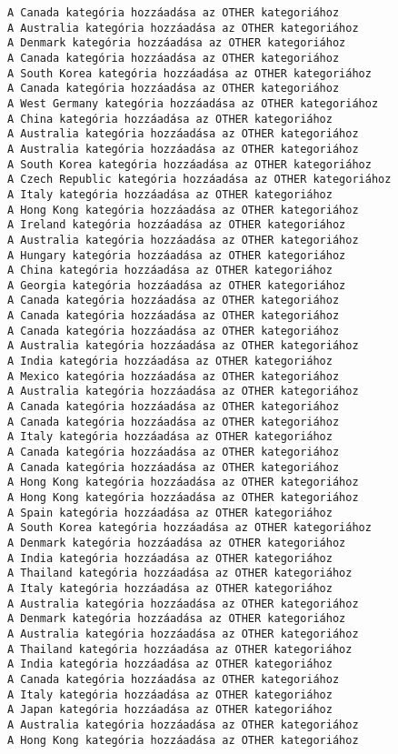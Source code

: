 \documentclass[11pt]{article}
\begin{document}
\begin{Verbatim}[commandchars=\\\{\}]
A Canada kategória hozzáadása az OTHER kategoriához
A Australia kategória hozzáadása az OTHER kategoriához
A Denmark kategória hozzáadása az OTHER kategoriához
A Canada kategória hozzáadása az OTHER kategoriához
A South Korea kategória hozzáadása az OTHER kategoriához
A Canada kategória hozzáadása az OTHER kategoriához
A West Germany kategória hozzáadása az OTHER kategoriához
A China kategória hozzáadása az OTHER kategoriához
A Australia kategória hozzáadása az OTHER kategoriához
A Australia kategória hozzáadása az OTHER kategoriához
A South Korea kategória hozzáadása az OTHER kategoriához
A Czech Republic kategória hozzáadása az OTHER kategoriához
A Italy kategória hozzáadása az OTHER kategoriához
A Hong Kong kategória hozzáadása az OTHER kategoriához
A Ireland kategória hozzáadása az OTHER kategoriához
A Australia kategória hozzáadása az OTHER kategoriához
A Hungary kategória hozzáadása az OTHER kategoriához
A China kategória hozzáadása az OTHER kategoriához
A Georgia kategória hozzáadása az OTHER kategoriához
A Canada kategória hozzáadása az OTHER kategoriához
A Canada kategória hozzáadása az OTHER kategoriához
A Canada kategória hozzáadása az OTHER kategoriához
A Australia kategória hozzáadása az OTHER kategoriához
A India kategória hozzáadása az OTHER kategoriához
A Mexico kategória hozzáadása az OTHER kategoriához
A Australia kategória hozzáadása az OTHER kategoriához
A Canada kategória hozzáadása az OTHER kategoriához
A Canada kategória hozzáadása az OTHER kategoriához
A Italy kategória hozzáadása az OTHER kategoriához
A Canada kategória hozzáadása az OTHER kategoriához
A Canada kategória hozzáadása az OTHER kategoriához
A Hong Kong kategória hozzáadása az OTHER kategoriához
A Hong Kong kategória hozzáadása az OTHER kategoriához
A Spain kategória hozzáadása az OTHER kategoriához
A South Korea kategória hozzáadása az OTHER kategoriához
A Denmark kategória hozzáadása az OTHER kategoriához
A India kategória hozzáadása az OTHER kategoriához
A Thailand kategória hozzáadása az OTHER kategoriához
A Italy kategória hozzáadása az OTHER kategoriához
A Australia kategória hozzáadása az OTHER kategoriához
A Denmark kategória hozzáadása az OTHER kategoriához
A Australia kategória hozzáadása az OTHER kategoriához
A Thailand kategória hozzáadása az OTHER kategoriához
A India kategória hozzáadása az OTHER kategoriához
A Canada kategória hozzáadása az OTHER kategoriához
A Italy kategória hozzáadása az OTHER kategoriához
A Japan kategória hozzáadása az OTHER kategoriához
A Australia kategória hozzáadása az OTHER kategoriához
A Hong Kong kategória hozzáadása az OTHER kategoriához

\end{Verbatim}
\end{document}
